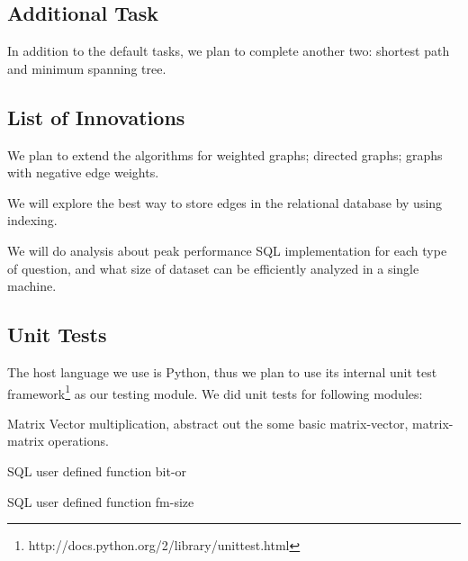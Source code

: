 \subsection{Additional Task}
In addition to the default tasks,  we plan to complete another two:  shortest path and minimum spanning tree. 

\subsection{List of Innovations}
\bit
\item We plan to extend the algorithms for weighted graphs; directed graphs; graphs with negative edge weights.
\item We will explore the best way to store edges in the relational database by using indexing.
\item We will do analysis about peak performance SQL implementation for each type of question, and what size of dataset can be efficiently analyzed in a single machine.
\eit

\subsection{Unit Tests}
The host language we use is Python, thus we plan to use its internal unit test framework\footnote{http://docs.python.org/2/library/unittest.html} as our testing module. We did unit tests for following modules:
\bit
\item Matrix Vector multiplication, abstract out the some basic matrix-vector, matrix-matrix operations. 
\item SQL user defined function bit-or
\item SQL user defined function fm-size
\eit






